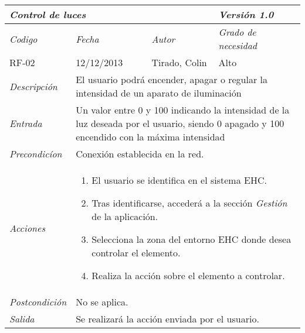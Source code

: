 \begin{center}
    \begin{tabular}{|p{3cm}|p{4cm}|p{4cm}|p{4cm}|}
    \hline \multicolumn{3}{|p{9cm}|}{\textit{Control de luces}} & \textit{Versi\'on 1.0} \\
    \hline \textit{Codigo} & \textit{Fecha} & \textit{Autor} & \textit{Grado de necesidad} \\
    RF-02 & 12/12/2013 & Tirado, Colin & Alto \\
    \hline \textit{Descripci\'on} & \multicolumn{3}{|p{9cm}|}{El usuario podr\'a encender, apagar o regular la intensidad de un aparato de iluminaci\'on} \\
    \hline \textit{Entrada} & \multicolumn{3}{|p{9cm}|}{Un valor entre 0 y 100 indicando la intensidad de la luz deseada por el usuario, siendo 0 apagado y 100 encendido con la máxima intensidad } \\
    \hline \textit{Precondic\'ion} & \multicolumn{3}{|p{9cm}|}{Conexi\'on establecida en la red.} \\
    \hline \textit{Acciones} & \multicolumn{3}{|p{9cm}|}{
    \begin{enumerate}
    \item El usuario se identifica en el sistema EHC.
    \item Tras identificarse, acceder\'a a la secci\'on \textit{Gesti\'on} de la aplicaci\'on.
    \item Selecciona la zona del entorno EHC donde desea controlar el elemento.
    \item Realiza la acci\'on sobre el elemento a controlar.
    \end{enumerate}
    } \\
    \hline \textit{Postcondici\'on} & \multicolumn{3}{|p{9cm}|}{No se aplica.} \\
    \hline \textit{Salida} & \multicolumn{3}{|p{9cm}|}{Se realizar\'a la acci\'on enviada por el usuario.} \\ \hline
    \end{tabular}
\end{center}
